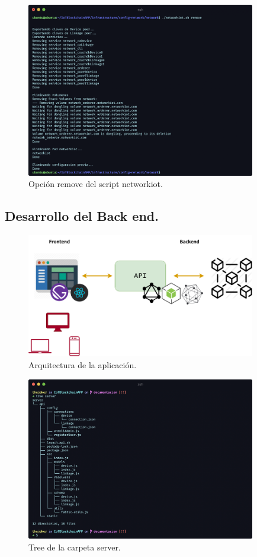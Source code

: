 \begin{figure}[ht!]
  \centering
  \includegraphics[width=10cm]{imagenes/desarrollo/comandos/remove}
  \caption{Opción remove del script networkiot.}
  \label{fig:remove}
\end{figure}

\subsection{Desarrollo del Back end.}

\begin{figure}[ht!]
  \centering
  \includegraphics[width=10cm]{imagenes/desarrollo/arquitectura_aplicacion}
  \caption{Arquitectura de la aplicación.}
  \label{fig:arquitectura-aplicacion}
\end{figure}

\begin{figure}[ht!]
  \centering
  \includegraphics[width=10cm]{imagenes/desarrollo/tree_server}
  \caption{Tree de la carpeta server.}
  \label{fig:tree-server}
\end{figure}

